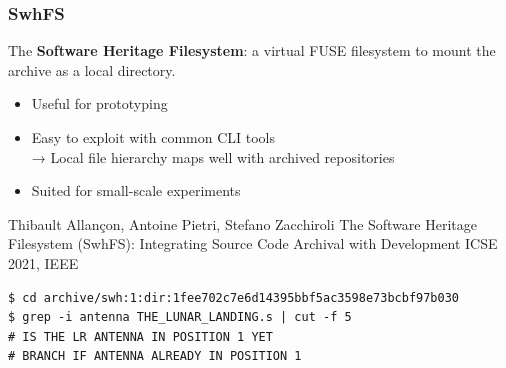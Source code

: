 \documentclass[aspectratio=169,xcolor=table]{beamer}
\begin{document}
    \begin{frame}[fragile]
        \frametitle{SwhFS}

        \begin{block}{}
            The \textbf{Software Heritage Filesystem}: a virtual FUSE
            filesystem to mount the archive as a local directory.

            \begin{itemize}
                \item Useful for prototyping
                \item Easy to exploit with common CLI tools \\
                    → Local file hierarchy maps well with archived repositories
                \item Suited for small-scale experiments
            \end{itemize}

            \footnotesize
            \begin{thebibliography}{swhfs}
                 Thibault Allançon, Antoine Pietri, Stefano Zacchiroli\newblock
                The Software Heritage Filesystem (SwhFS): Integrating Source Code Archival with Development\newblock
                ICSE 2021, IEEE\newblock
            \end{thebibliography}
        \end{block}

        \begin{block}{}
            \begin{verbatim}
$ cd archive/swh:1:dir:1fee702c7e6d14395bbf5ac3598e73bcbf97b030
$ grep -i antenna THE_LUNAR_LANDING.s | cut -f 5
# IS THE LR ANTENNA IN POSITION 1 YET
# BRANCH IF ANTENNA ALREADY IN POSITION 1
            \end{verbatim}
        \end{block}
    \end{frame}
\end{document}
